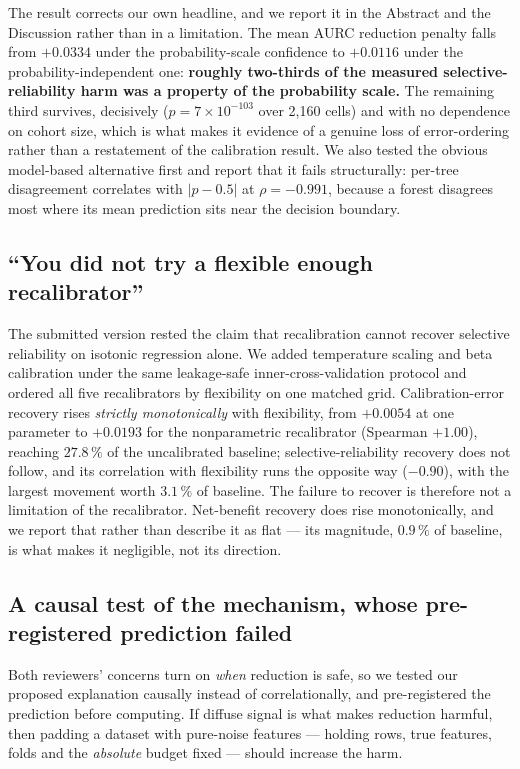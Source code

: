 \documentclass[11pt]{article}
\begin{document}
The result corrects our own headline, and we report it in the Abstract and the Discussion rather
than in a limitation. The mean AURC reduction penalty falls from $+0.0334$ under the
probability-scale confidence to $+0.0116$ under the probability-independent one: \textbf{roughly
two-thirds of the measured selective-reliability harm was a property of the probability scale.} The
remaining third survives, decisively ($p=7\times10^{-103}$ over 2{,}160 cells) and with no
dependence on cohort size, which is what makes it evidence of a genuine loss of error-ordering
rather than a restatement of the calibration result. We also tested the obvious model-based
alternative first and report that it fails structurally: per-tree disagreement correlates with
$|p-0.5|$ at $\rho=-0.991$, because a forest disagrees most where its mean prediction sits near the
decision boundary.

\subsection*{``You did not try a flexible enough recalibrator''}

The submitted version rested the claim that recalibration cannot recover selective reliability on
isotonic regression alone. We added temperature scaling and beta calibration under the same
leakage-safe inner-cross-validation protocol and ordered all five recalibrators by flexibility on one
matched grid. Calibration-error recovery rises \emph{strictly monotonically} with flexibility, from
$+0.0054$ at one parameter to $+0.0193$ for the nonparametric recalibrator (Spearman $+1.00$),
reaching $27.8\,\%$ of the uncalibrated baseline; selective-reliability recovery does not follow, and
its correlation with flexibility runs the opposite way ($-0.90$), with the largest movement worth
$3.1\,\%$ of baseline. The failure to recover is therefore not a limitation of the recalibrator.
Net-benefit recovery does rise monotonically, and we report that rather than describe it as flat ---
its magnitude, $0.9\,\%$ of baseline, is what makes it negligible, not its direction.

\subsection*{A causal test of the mechanism, whose pre-registered prediction failed}

Both reviewers' concerns turn on \emph{when} reduction is safe, so we tested our proposed explanation
causally instead of correlationally, and pre-registered the prediction before computing. If diffuse
signal is what makes reduction harmful, then padding a dataset with pure-noise features --- holding
rows, true features, folds and the \emph{absolute} budget fixed --- should increase the harm.
\end{document}
